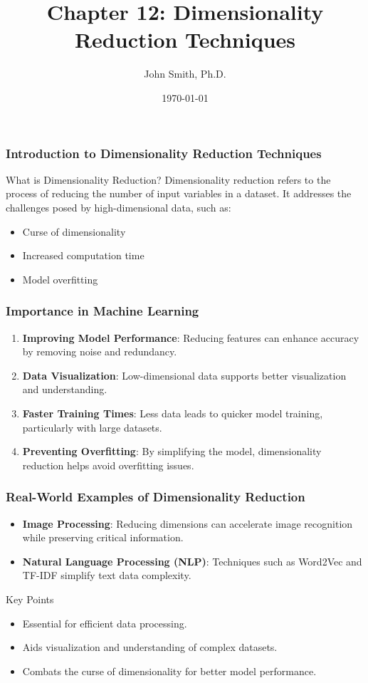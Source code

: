 \documentclass[aspectratio=169]{beamer}
\title[Chapter 12: Dimensionality Reduction Techniques]{Chapter 12: Dimensionality Reduction Techniques}
\author[J. Smith]{John Smith, Ph.D.}
\institute[University Name]{
  Department of Computer Science\\
  University Name\\
  \vspace{0.3cm}
  Email: email@university.edu\\
  Website: www.university.edu
}
\date{\today}
\begin{document}
\frame{\titlepage}

\begin{frame}[fragile]
    \frametitle{Introduction to Dimensionality Reduction Techniques}
    \begin{block}{What is Dimensionality Reduction?}
        Dimensionality reduction refers to the process of reducing the number of input variables in a dataset. 
        It addresses the challenges posed by high-dimensional data, such as:
        \begin{itemize}
            \item Curse of dimensionality
            \item Increased computation time
            \item Model overfitting
        \end{itemize}
    \end{block}
\end{frame}

\begin{frame}[fragile]
    \frametitle{Importance in Machine Learning}
    \begin{enumerate}
        \item \textbf{Improving Model Performance}: Reducing features can enhance accuracy by removing noise and redundancy.
        \item \textbf{Data Visualization}: Low-dimensional data supports better visualization and understanding.
        \item \textbf{Faster Training Times}: Less data leads to quicker model training, particularly with large datasets.
        \item \textbf{Preventing Overfitting}: By simplifying the model, dimensionality reduction helps avoid overfitting issues.
    \end{enumerate}
\end{frame}

\begin{frame}[fragile]
    \frametitle{Real-World Examples of Dimensionality Reduction}
    \begin{itemize}
        \item \textbf{Image Processing}: Reducing dimensions can accelerate image recognition while preserving critical information.
        \item \textbf{Natural Language Processing (NLP)}: Techniques such as Word2Vec and TF-IDF simplify text data complexity.
    \end{itemize}
    \begin{block}{Key Points}
        \begin{itemize}
            \item Essential for efficient data processing.
            \item Aids visualization and understanding of complex datasets.
            \item Combats the curse of dimensionality for better model performance.
        \end{itemize}
    \end{block}
\end{frame}
\end{document}
